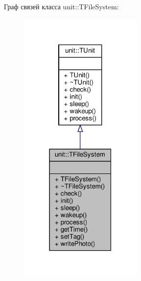 Граф связей класса unit\+:\+:T\+File\+System\+:\nopagebreak
\begin{figure}[H]
\begin{center}
\leavevmode
\includegraphics[width=174pt]{classunit_1_1_t_file_system__coll__graph}
\end{center}
\end{figure}
